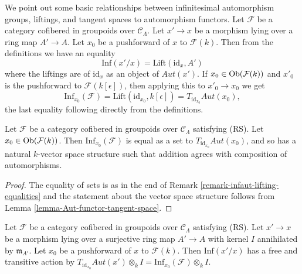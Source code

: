 \begin{remark}
\label{remark-infaut-lifting-equalities}
We point out some basic relationships between infinitesimal automorphism
groups, liftings, and tangent spaces to automorphism functors. Let
$\mathcal{F}$ be a category cofibered in groupoids over $\mathcal{C}_\Lambda$.
Let $x' \to x$ be a morphism lying over a ring map $A' \to A$.  Let
$x_0$ be a pushforward of $x$ to $\mathcal{F}(k)$.
Then from the definitions we have an equality
$$
\text{Inf}(x'/x) = \text{Lift}(\text{id}_x, A')
$$
where the liftings are of $\text{id}_x$ as an object of
$\mathit{Aut}(x')$.  If $x_0 \in \mathop{\rm Ob}\nolimits(\mathcal{F}(k))$ and $x'_0$
is the pushforward to $\mathcal{F}(k[\epsilon])$, then applying this to
$x'_0 \to x_0$ we get
$$
\text{Inf}_{x_0}(\mathcal{F}) =
\text{Lift}(\text{id}_{x_0}, k[\epsilon]) =
T_{\text{id}_{x_0}} \mathit{Aut}(x_0),
$$
the last equality following directly from the definitions.
\end{remark}

\begin{lemma}
\label{lemma-infaut-vector-space}
Let $\mathcal{F}$ be a category cofibered in groupoids over
$\mathcal{C}_\Lambda$ satisfying (RS). Let $x_0 \in \mathop{\rm Ob}\nolimits(\mathcal{F}(k))$.
Then $\text{Inf}_{x_0}(\mathcal{F})$ is equal as a set to
$T_{\text{id}_{x_0}} \mathit{Aut}(x_0)$, and so has a natural $k$-vector
space structure such that addition agrees with composition of automorphisms.
\end{lemma}

\begin{proof}
The equality of sets is as in the end of
Remark \ref{remark-infaut-lifting-equalities}
and the statement about the vector space structure follows from
Lemma \ref{lemma-Aut-functor-tangent-space}.
\end{proof}

\begin{lemma}
\label{lemma-lifted-automorphisms-torsor}
Let $\mathcal{F}$ be a category cofibered in groupoids over
$\mathcal{C}_\Lambda$ satisfying (RS). Let $x' \to x$ be a
morphism lying over a surjective ring map $A' \to A$ with kernel $I$
annihilated by $\mathfrak m_{A'}$. Let $x_0$ be a pushforward of $x$ to
$\mathcal{F}(k)$. Then $\text{Inf}(x'/x)$ has a free and transitive action by
$T_{\text{id}_{x_0}} \mathit{Aut}(x') \otimes_k I
= \text{Inf}_{x_0}(\mathcal{F}) \otimes_k I$.
\end{lemma}

